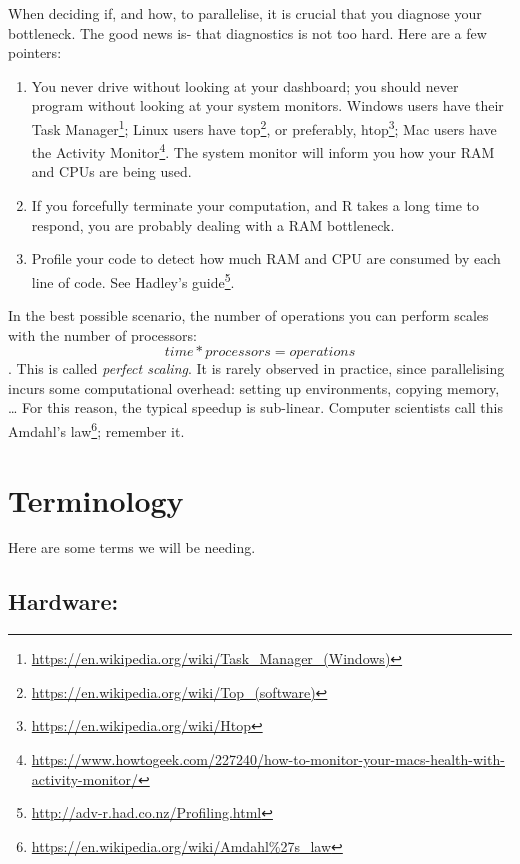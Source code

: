 \documentclass[]{book}
\renewcommand{\href}[2]{#2\footnote{\url{#1}}}
\theoremstyle{definition}
\theoremstyle{definition}
\theoremstyle{definition}
\theoremstyle{remark}
\begin{document}
When deciding if, and how, to parallelise, it is crucial that you diagnose your bottleneck.
The good news is- that diagnostics is not too hard.
Here are a few pointers:

\begin{enumerate}
\def\labelenumi{\arabic{enumi}.}
\item
  You never drive without looking at your dashboard; you should never program without looking at your system monitors. Windows users have their \href{https://en.wikipedia.org/wiki/Task_Manager_(Windows)}{Task Manager}; Linux users have \href{https://en.wikipedia.org/wiki/Top_(software)}{top}, or preferably, \href{https://en.wikipedia.org/wiki/Htop}{htop}; Mac users have the \href{https://www.howtogeek.com/227240/how-to-monitor-your-macs-health-with-activity-monitor/}{Activity Monitor}. The system monitor will inform you how your RAM and CPUs are being used.
\item
  If you forcefully terminate your computation, and R takes a long time to respond, you are probably dealing with a RAM bottleneck.
\item
  Profile your code to detect how much RAM and CPU are consumed by each line of code. See Hadley's \href{http://adv-r.had.co.nz/Profiling.html}{guide}.
\end{enumerate}

In the best possible scenario, the number of operations you can perform scales with the number of processors: \[time * processors = operations\].
This is called \emph{perfect scaling}.
It is rarely observed in practice, since parallelising incurs some computational overhead: setting up environments, copying memory, \ldots{}
For this reason, the typical speedup is sub-linear.
Computer scientists call this \href{https://en.wikipedia.org/wiki/Amdahl\%27s_law}{Amdahl's law}; remember it.

\hypertarget{terminology}{%
\section{Terminology}\label{terminology}}

Here are some terms we will be needing.

\hypertarget{hardware}{%
\subsection{Hardware:}\label{hardware}}
\end{document}
